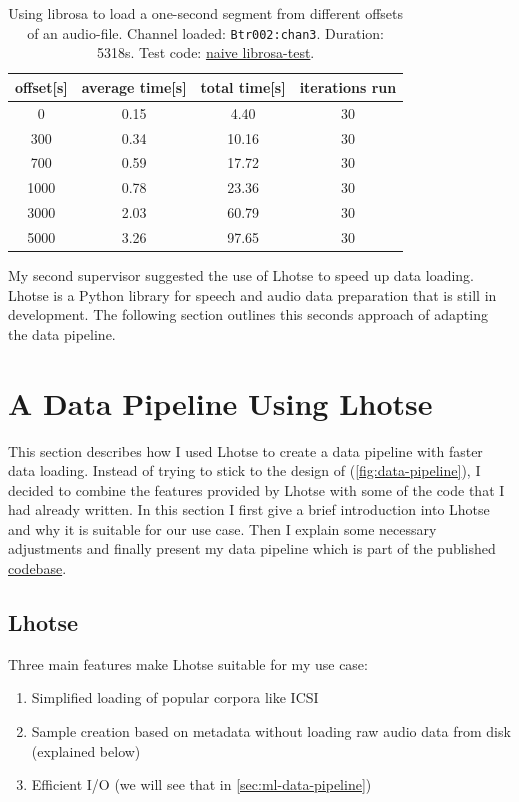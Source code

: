 \documentclass[bsc,frontabs,parskip,deptreport]{infthesis}
\newcommand{\coderepo}{\href{https://github.com/LasseWolter/laughter-detection-icsi}{codebase}}
\begin{document}
\begin{table}[h!]
    \centering
    \begin{tabular}{|c|c|c|c|}
    \hline
    offset[s] & average time[s] & total time[s] & iterations run \\
    \hline
    0  & 0.15 & 4.40 & 30    \\
    300 & 0.34 & 10.16 & 30  \\ 
    700 & 0.59 & 17.72 & 30  \\
    1000 & 0.78 & 23.36 & 30 \\  
    3000 & 2.03 & 60.79 & 30 \\
    5000 & 3.26 & 97.65 & 30 \\
    \hline
    \end{tabular}
    \caption{Using librosa \citep{mcfee2015librosa} to load a one-second segment from different offsets of an audio-file. Channel loaded: \texttt{Btr002:chan3}. Duration: 5318s. Test code: \href{https://github.com/LasseWolter/laughter-detection-icsi/tree/main/misc_scripts}{naive librosa-test}.}
    \label{tab:librosa-loading-times}
\end{table}


My second supervisor suggested the use of Lhotse \citep{zelasko2021lhotse} to speed up data loading. Lhotse is a Python library for speech and audio data preparation that is still in development. The following section outlines this seconds approach of adapting the data pipeline.

\section{A Data Pipeline Using Lhotse}
This section describes how I used Lhotse to create a data pipeline with faster data loading. Instead of trying to stick to the design of \citet{gillick2021robust} (\autoref{fig:data-pipeline}), I decided to combine the features provided by Lhotse with some of the code that I had already written. 
In this section I first give a brief introduction into Lhotse and why it is suitable for our use case. Then I explain some necessary adjustments and finally present my data pipeline which is part of the published \coderepo.

\subsection{Lhotse} \label{sec:lhotse}
Three main features make Lhotse suitable for my use case:
\begin{enumerate}
    \item Simplified loading of popular corpora like ICSI
    \item Sample creation based on metadata without loading raw audio data from disk (explained below)
    \item Efficient I/O (we will see that in \autoref{sec:ml-data-pipeline}) 
\end{enumerate}
\end{document}
